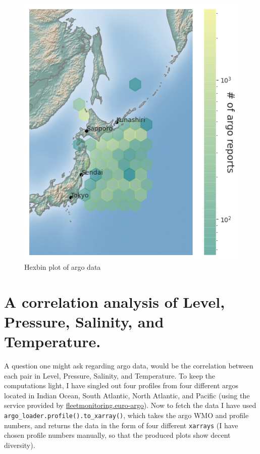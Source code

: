 \documentclass[12pt]{article}
\begin{document}
\begin{figure}[!h]
\centering
\includegraphics[scale=0.9]{hexbin_argos_locations.png}
\caption{Hexbin plot of argo data}
\label{hexbin}
\end{figure}

\section{A correlation analysis of Level, Pressure, Salinity, 
and Temperature.}

A question one might ask regarding argo data, would be the correlation 
between each pair in Level, 
Pressure, Salinity, and Temperature. To keep the computations light, 
I have singled out four profiles from four different
argos located in Indian Ocean, South Atlantic, North Atlantic, and 
Pacific (using the service provided by 
\href{https://fleetmonitoring.euro-argo.eu/dashboard?Status=Active}{fleetmonitoring.euro-argo}). Now to fetch  
the data I have used \verb|argo_loader.profile().to_xarray()|, which 
takes the argo WMO and profile numbers, and returns the data
in the form of four different \verb|xarrays| (I have chosen profile 
numbers 
manually, so that the produced plots show decent diversity).\\
\end{document}
